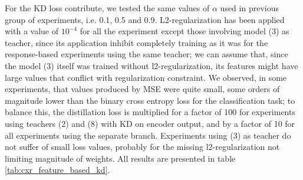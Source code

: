 For the KD loss contribute, we tested the same values of $\alpha$ used in previous group of experiments, i.e. 0.1, 0.5 and 0.9.
L2-regularization has been applied with a value of $10^{-4}$ for all the experiment except those involving model (3) as teacher, since its application inhibit completely training as it was for the response-based experiments using the same teacher; we can assume that, since the model (3) itself was trained without l2-regularization, its features might have large values that conflict with regularization constraint.
We observed, in some experiments, that values produced by MSE were quite small, some orders of magnitude lower than the binary cross entropy loss for the classification task; to balance this, the distillation loss is multiplied for a factor of 100 for experiments using teachers (2) and (8) with KD on encoder output, and by a factor of 10 for all experiments using the separate branch.
Experiments using (3) as teacher do not suffer of small loss values, probably for the missing l2-regularization not limiting magnitude of weights.
All results are presented in table \ref{tab:cxr_feature_based_kd}.

